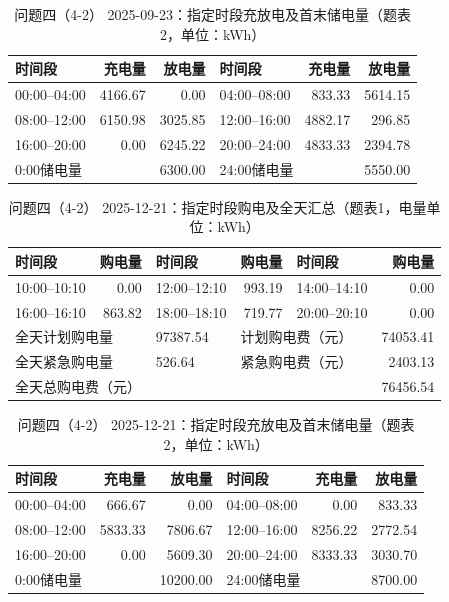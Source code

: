 \begin{table}[H]
\centering\footnotesize
\setlength{\tabcolsep}{4pt}
\caption{问题四（4-2） 2025-09-23：指定时段充放电及首末储电量（题表2，单位：kWh）}
\label{tab:required-q42-2025-09-23-storage}
\begin{tabular}{@{}lrrlrr@{}}
\toprule
时间段 & 充电量 & 放电量 & 时间段 & 充电量 & 放电量 \\
\midrule
00:00--04:00 & 4166.67 & 0.00 & 04:00--08:00 & 833.33 & 5614.15 \\
08:00--12:00 & 6150.98 & 3025.85 & 12:00--16:00 & 4882.17 & 296.85 \\
16:00--20:00 & 0.00 & 6245.22 & 20:00--24:00 & 4833.33 & 2394.78 \\
\multicolumn{2}{l}{0:00储电量} & 6300.00 & \multicolumn{2}{l}{24:00储电量} & 5550.00 \\
\bottomrule
\end{tabular}
\end{table}

\FloatBarrier
\begin{table}[H]
\centering\footnotesize
\setlength{\tabcolsep}{4pt}
\caption{问题四（4-2） 2025-12-21：指定时段购电及全天汇总（题表1，电量单位：kWh）}
\label{tab:required-q42-2025-12-21-grid}
\begin{tabular}{@{}lrlrlr@{}}
\toprule
时间段 & 购电量 & 时间段 & 购电量 & 时间段 & 购电量 \\
\midrule
10:00--10:10 & 0.00 & 12:00--12:10 & 993.19 & 14:00--14:10 & 0.00 \\
16:00--16:10 & 863.82 & 18:00--18:10 & 719.77 & 20:00--20:10 & 0.00 \\
\multicolumn{2}{l}{全天计划购电量} & 97387.54 & \multicolumn{2}{l}{计划购电费（元）} & 74053.41 \\
\multicolumn{2}{l}{全天紧急购电量} & 526.64 & \multicolumn{2}{l}{紧急购电费（元）} & 2403.13 \\
\multicolumn{5}{l}{全天总购电费（元）} & 76456.54 \\
\bottomrule
\end{tabular}
\end{table}

\begin{table}[H]
\centering\footnotesize
\setlength{\tabcolsep}{4pt}
\caption{问题四（4-2） 2025-12-21：指定时段充放电及首末储电量（题表2，单位：kWh）}
\label{tab:required-q42-2025-12-21-storage}
\begin{tabular}{@{}lrrlrr@{}}
\toprule
时间段 & 充电量 & 放电量 & 时间段 & 充电量 & 放电量 \\
\midrule
00:00--04:00 & 666.67 & 0.00 & 04:00--08:00 & 0.00 & 833.33 \\
08:00--12:00 & 5833.33 & 7806.67 & 12:00--16:00 & 8256.22 & 2772.54 \\
16:00--20:00 & 0.00 & 5609.30 & 20:00--24:00 & 8333.33 & 3030.70 \\
\multicolumn{2}{l}{0:00储电量} & 10200.00 & \multicolumn{2}{l}{24:00储电量} & 8700.00 \\
\bottomrule
\end{tabular}
\end{table}

